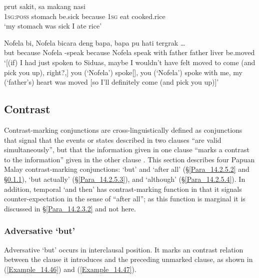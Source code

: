 \ea\label{Example_14.44}
 {prut} {sakit,} {} {sa} {makang} {nasi}\\ %
 \textsc{1sg:poss}  stomach  be.sick  because  \textsc{1sg}  eat  cooked.rice\\
\glt ‘my stomach was sick  I ate rice’ \textstyleExampleSource{[081025-009a-Cv.0046]}
\z

\ea
\label{Example_14.45}

\gll {\ldots}      Nofela  bi,    Nofela  bicara deng  bapa,  bapa  pu  hati  tergrak  {\ldots}\\  
{} but  because  Nofela  {-speak}  because  Nofela  speak with  father  father    liver  be.moved  \\
 ‘[(if) I had just spoken to Siduas, maybe I wouldn’t have felt moved to come (and pick you up), right?,]  you (‘Nofela’) spoke[],  you (‘Nofela’) spoke with me, my (‘father’s) heart was moved [so I’ll definitely come (and pick you up)]’ \textstyleExampleSource{[080922-001a-CvPh.1082-1083]}
\z

\subsection{Contrast}
\label{Para_14.2.5}
Contrast-marking conjunctions are cross-linguistically defined as conjunctions that signal that the events or states described in two clauses “are valid simultaneously”, but that the information given in one clause “marks a contrast to the information” given in the other clause \citep[20]{Rudolph.1996}. This section describes four Papuan Malay contrast-marking conjunctions:   ‘but’ and  ‘after all’ (§\ref{Para_14.2.5.2} and §\ref{Para_14.2.5.1}),   ‘but actually’ (§\ref{Para_14.2.5.3}), and   ‘although’ (§\ref{Para_14.2.5.4}). In addition, temporal  ‘and then’ has contrast-marking function in that it signals counter-expectation in the sense of ``after all''; as this function is marginal it is discussed in §\ref{Para_14.2.3.2} and not here.


\subsubsection[Adversative tapi ‘but’]{Adversative  ‘but’}
\label{Para_14.2.5.1}
Adversative  ‘but’ occurs in interclausal position. It marks an  contrast relation between the clause it introduces and the preceding unmarked clause, as shown in (\ref{Example_14.46}) and (\ref{Example_14.47}).
%


